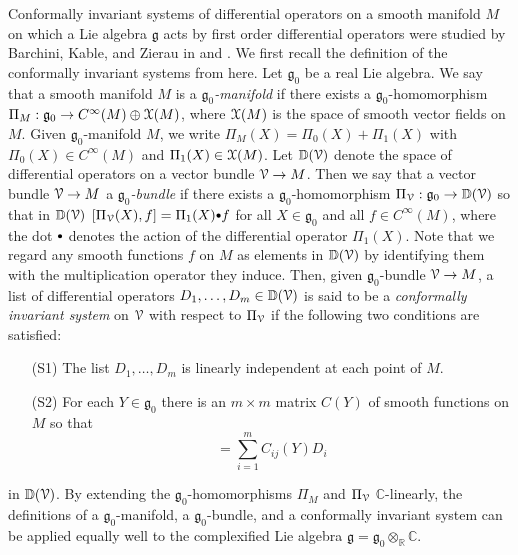 \documentclass[11pt]{amsart}
\numberwithin{equation}{section}
\begin{document}
Conformally invariant systems of differential operators 
on a smooth manifold $M$ on which a Lie algebra ${{\mathfrak g}}$ acts by first order 
differential operators were studied by Barchini, Kable, and Zierau 
in \cite{BKZ08} and \cite{BKZ09}.  
We first recall the definition of the conformally invariant systems
from \cite{BKZ09} here.
Let ${{\mathfrak g}}_0$ be a real Lie algebra. We say that a smooth manifold $M$
is a \emph{${{\mathfrak g}}_0$-manifold} if there exists a ${{\mathfrak g}}_0$-homomorphism 
$\Pi_M: {{\mathfrak g}}_0 \to C^\infty(M)\oplus {\EuScript{X}}(M)$, 
where ${\EuScript{X}}(M)$ is the space of smooth vector fields on $M$. 
Given ${{\mathfrak g}}_0$-manifold $M$, we write 
$\Pi_M(X) = \Pi_0(X) + \Pi_1(X)$ with $\Pi_0(X) \in C^\infty(M)$
and $\Pi_1(X) \in {\EuScript{X}}(M)$. 
Let $\mathbb{D}({\EuScript{V}})$ denote the space of differential operators 
on a vector bundle ${\EuScript{V}} \to M$.
Then we say that a vector bundle ${\EuScript{V}} \to M$
a \emph{${{\mathfrak g}}_0$-bundle} if 
there exists a ${{\mathfrak g}}_0$-homomorphism 
$\Pi_{\EuScript{V}}: {{\mathfrak g}}_0 \to \mathbb{D}({\EuScript{V}})$ so that 
in $\mathbb{D}({\EuScript{V}})$ $[\Pi_{\EuScript{V}}(X), f]= \Pi_1(X) { {\raisebox{1pt} {$\scriptstyle \bullet$} } } f$
for all $X \in {{\mathfrak g}}_0$ and all $f \in C^\infty(M)$,
where the dot ${ {\raisebox{1pt} {$\scriptstyle \bullet$} } }$ denotes 
the action of the differential operator $\Pi_1(X)$. 
Note that we regard any smooth functions $f$ on $M$ 
as elements in $\mathbb{D}({\EuScript{V}})$ by identifying them with
the multiplication operator they induce.
Then, given ${{\mathfrak g}}_0$-bundle ${\EuScript{V}}\to M$,
a list of differential operators
$D_1, \ldots, D_m \in \mathbb{D}({\EuScript{V}})$
is said to be a \emph{conformally invariant system}
on ${\EuScript{V}}$ with respect to $\Pi_{\EuScript{V}}$
if the following two conditions are satisfied:
\begin{enumerate}
\item[(S1)] The list $ D_1, \ldots, D_m $ is linearly independent at each point of $M$. 
\item[(S2)] For each $Y \in {{\mathfrak g}}_0$ there is an $m \times m$ matrix $C(Y)$ of smooth functions
on $M$ so that
\begin{equation*}
[\Pi_{\EuScript{V}}(Y), D_j] = \sum_{i=1}^m C_{ij}(Y)D_i
\end{equation*}
\end{enumerate}
in $\mathbb{D}({\EuScript{V}})$. 
By extending the ${{\mathfrak g}}_0$-homomorphisms $\Pi_M$ and $\Pi_{\EuScript{V}}$ ${\mathbb{C}}$-linearly, 
the definitions of a ${{\mathfrak g}}_0$-manifold, a ${{\mathfrak g}}_0$-bundle, and 
a conformally invariant system can be applied equally well to
the complexified Lie algebra ${{\mathfrak g}} = {{\mathfrak g}}_0 \otimes_{\mathbb{R}} {\mathbb{C}}$.
\end{document}
